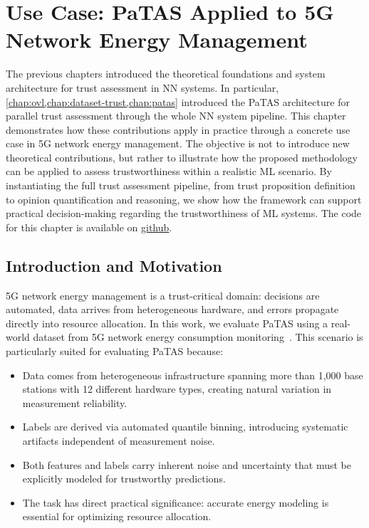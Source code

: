 \chapter{Use Case: \acs{PaTAS} Applied to 5G Network Energy Management}
\label{chap:usecase}
\noindent
The previous chapters introduced the theoretical foundations and system architecture for trust assessment in \ac{NN} systems. In particular, \cref{chap:ovl,chap:dataset-trust,chap:patas} introduced the \ac{PaTAS} architecture for parallel trust assessment through the whole \ac{NN} system pipeline. This chapter demonstrates how these contributions apply in practice through a concrete use case in 5G network energy management. The objective is not to introduce new theoretical contributions, but rather to illustrate how the proposed methodology can be applied to assess trustworthiness within a realistic \ac{ML} scenario. By instantiating the full trust assessment pipeline, from trust proposition definition to opinion quantification and reasoning, we show how the framework can support practical decision-making regarding the trustworthiness of \ac{ML} systems. The code for this chapter is available on \href{https://github.com/Ouatt-Isma/PaTAS-Subjective-Logic-Neural-Networks-Trust-Assessment}{github}.


\section{Introduction and Motivation}
\label{sec:intro}
5G network energy management is a trust-critical domain: decisions are automated, data arrives from heterogeneous hardware, and errors propagate directly into resource allocation. In this work, we evaluate \ac{PaTAS} using a real-world dataset from 5G network energy consumption monitoring~\cite{netop_5g_energy_2026}. This scenario is particularly suited for evaluating \ac{PaTAS} because:
\begin{itemize}
    \item Data comes from heterogeneous infrastructure spanning more than 1,000 base stations with 12 different hardware types, creating natural variation in measurement reliability.
    \item Labels are derived via automated quantile binning, introducing systematic artifacts independent of measurement noise.
    \item Both features and labels carry inherent noise and uncertainty that must be explicitly modeled for trustworthy predictions.
    \item The task has direct practical significance: accurate energy modeling is essential for optimizing resource allocation.
\end{itemize}

